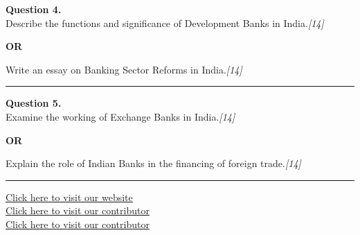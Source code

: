 \documentclass[11pt,a4paper]{article}
\newcommand{\pts}[1]{\hfill   \textit{[#1]}}
\begin{document}
\noindent   \textbf{Question 4.} \\
Describe the functions and significance of Development Banks in India.\pts{14}

\centerline{   \textbf{OR}}

Write an essay on Banking Sector Reforms in India.\pts{14}

\medskip\rule{\linewidth}{0.2pt}




\noindent   \textbf{Question 5.} \\
Examine the working of Exchange Banks in India.\pts{14}

\centerline{   \textbf{OR}}

Explain the role of Indian Banks in the financing of foreign trade.\pts{14}

\vfill
\rule{\linewidth}{0.4pt}

\begin{center}\small
\href{https://bhu-exam.vercel.app/}{Click here to visit our website}\\[4pt]
\href{https://me-aryan.vercel.app/}{Click here to visit our contributor}\\[4pt]
\href{https://quashan-me.vercel.app/}{Click here to visit our contributor}
\end{center}
\end{document}

